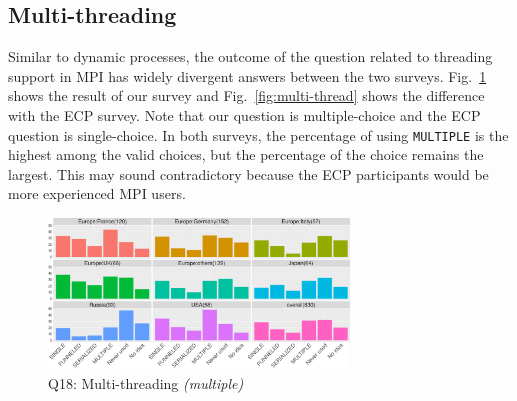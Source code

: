 \documentclass[preprint,5p,times]{elsarticle}
\def\myquote#1{{\it #1}}
\newcommand{\revision}[2]{{\color{blue}#2}}
\begin{document}

\subsection{Multi-threading}\label{sec:mutil-threading}

Similar to dynamic processes, the outcome of the question related to threading
support in MPI has widely divergent answers between the two surveys.
Fig.~\ref{fig:multi-thread-reg} shows the result of our survey and
Fig.~\ref{fig:multi-thread} shows the difference with the ECP survey. Note that
our question is multiple-choice and the ECP question is single-choice. In both
surveys, the percentage of using {\tt MULTIPLE} is the highest among the valid
choices, but the percentage of the choice \revision{\myquote{I don't know}}{\myquote{No idea}} remains the
largest. This may sound contradictory because the ECP participants would be more
experienced MPI users.

\begin{figure}[tb]
  \begin{center}
    \includegraphics[width=8.0cm]{R-scripts/Q18.pdf}
    \caption{Q18: Multi-threading {\it(multiple)}}
    \label{fig:multi-thread-reg}
\vspace{-3mm}%
  \end{center}
\end{figure}
\end{document}
